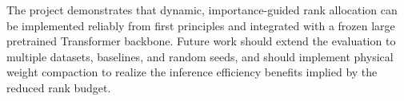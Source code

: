 \documentclass[conference]{IEEEtran}
\begin{document}
The project demonstrates that dynamic, importance-guided rank
allocation can be implemented reliably from first principles
and integrated with a frozen large pretrained Transformer
backbone. Future work should extend the evaluation to multiple
datasets, baselines, and random seeds, and should implement
physical weight compaction to realize the inference efficiency
benefits implied by the reduced rank budget.



\end{document}
